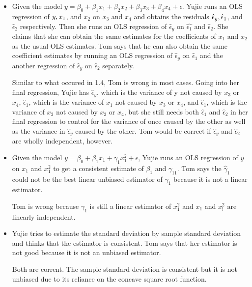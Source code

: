 \documentclass[11pt]{SelfArxOneColBMN}
\begin{document}
\begin{exercise}
	\begin{itemize}
		\item Given the model $y = \beta_0 + \beta_1x_1 + \beta_2x_2 + \beta_3x_3 + \beta_4x_4 + \epsilon$. Yujie runs an OLS regression of $y,\space x_1$, and $x_2$ on $x_3$ and $x_4$ and obtains the residuals $\hat{\epsilon}_y, \space \hat{\epsilon}_1$, and $\hat{\epsilon}_2$ respectively. Then she runs an OLS regression of $\hat{\epsilon}_y$ on $\hat{\epsilon_1}$ and $\hat{\epsilon}_2$. She claims that she can obtain the same estimates for the coefficients of $x_1$ and $x_2$ as the usual OLS estimates. Tom says that he can also obtain the same coefficient estimates by running an OLS regression of $\hat{\epsilon}_y$ on $\hat{\epsilon}_1$ and the another regression of $\hat{\epsilon}_y$ on $\hat{\epsilon}_2$ separately.
		\begin{solution}
			Similar to what occured in 1.4, Tom is wrong in most cases. Going into her final regression, Yujie has $\hat{\epsilon}_y$, which is the variance of y not caused by $x_3$ or $x_4$, $\hat{\epsilon}_1$, which is the variance of $x_1$ not caused by $x_3$ or $x_4$, and $\hat{\epsilon}_1$, which is the variance of $x_2$ not caused by $x_3$ or $x_4$, but she still needs both $\hat{\epsilon}_1$ and $\hat{\epsilon}_2$ in her final regression to control for the variance of once caused by the other as well as the variance in $\hat{\epsilon}_y$ caused by the other. Tom would be correct if $\hat{\epsilon}_y$ and $\hat{\epsilon}_2$ are wholly independent, however.
		\end{solution}
		\item Given the model $y = \beta_0 + \beta_1x_1 + \gamma_1x_1^2 + \epsilon$, Yujie runs an OLS regression of $y$ on $x_1$ and $x_1^2$ to get a consistent estimate of $\beta_1$ and $\gamma_11$. Tom says the $\hat{\gamma}_1$ could not be the best linear unbiased estimator of $\gamma_1$ because it is not a linear estimator.
		\begin{solution}
			Tom is wrong because $\gamma_1$ is still a linear estimator of $x_1^2$ and $x_1$ and $x_!^2$ are linearly independent.
		\end{solution}
		\item Yujie tries to estimate the standard deviation by sample standard deviation and thinks that the estimator is consistent. Tom says that her estimator is not good because it is not an unbiased estimator. 
		\begin{solution}
			Both are corrent. The sample standard deviation is consistent but it is not unbiased due to its reliance on the concave square root function. 
		\end{solution}
	\end{itemize}
\end{exercise}
\end{document}

